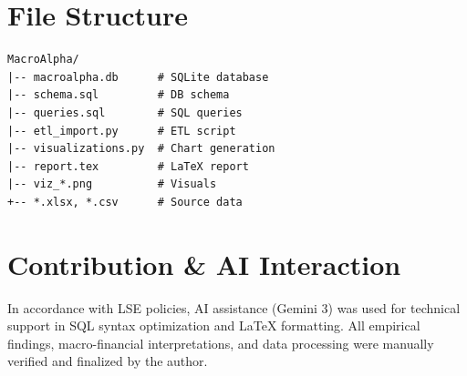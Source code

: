 \documentclass[10pt,a4paper]{article}
\begin{document}
\appendix
\begin{minipage}[t]{0.48\textwidth}
\section{File Structure}
\vspace{-0.5em}
\begin{verbatim}
MacroAlpha/
|-- macroalpha.db      # SQLite database
|-- schema.sql         # DB schema
|-- queries.sql        # SQL queries
|-- etl_import.py      # ETL script
|-- visualizations.py  # Chart generation
|-- report.tex         # LaTeX report
|-- viz_*.png          # Visuals
+-- *.xlsx, *.csv      # Source data
\end{verbatim}
\end{minipage}
\hfill
\begin{minipage}[t]{0.48\textwidth}
\section{Contribution \& AI Interaction}
\vspace{-0.5em}
In accordance with LSE policies, AI assistance (Gemini 3) was used for technical support in SQL syntax optimization and LaTeX formatting. All empirical findings, macro-financial interpretations, and data processing were manually verified and finalized by the author.
\end{minipage}
\end{document}
